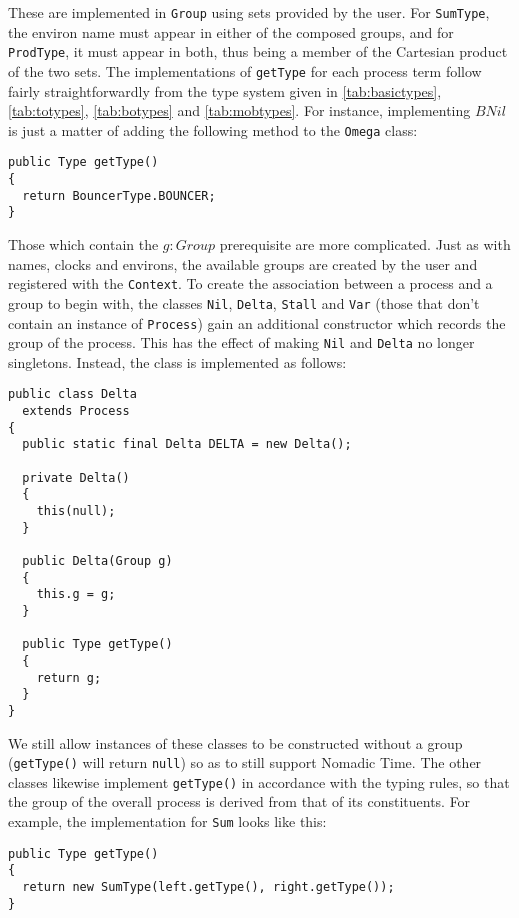 These are implemented in \texttt{Group} using sets provided by the
user.  For \texttt{SumType}, the environ name must appear in either of
the composed groups, and for \texttt{ProdType}, it must appear in
both, thus being a member of the Cartesian product of the two sets.
The implementations of \texttt{getType} for each process term follow
fairly straightforwardly from the type system given in
\ref{tab:basictypes}, \ref{tab:totypes}, \ref{tab:botypes} and
\ref{tab:mobtypes}.  For instance, implementing $BNil$ is just a
matter of adding the following method to the \texttt{Omega} class:

\begin{verbatim}
public Type getType()
{
  return BouncerType.BOUNCER;
}
\end{verbatim}

Those which contain the $g : Group$ prerequisite are more complicated.
Just as with names, clocks and environs, the available groups are
created by the user and registered with the \texttt{Context}.  To
create the association between a process and a group to begin with,
the classes \texttt{Nil}, \texttt{Delta}, \texttt{Stall} and
\texttt{Var} (those that don't contain an instance of
\texttt{Process}) gain an additional constructor which records the
group of the process.  This has the effect of making \texttt{Nil} and
\texttt{Delta} no longer singletons.  Instead, the class is
implemented as follows:

\begin{verbatim}
public class Delta
  extends Process
{
  public static final Delta DELTA = new Delta();

  private Delta() 
  { 
    this(null); 
  }
  
  public Delta(Group g) 
  { 
    this.g = g; 
  }

  public Type getType()
  {
    return g;
  }
}
\end{verbatim}

We still allow instances of these classes to be constructed without a
group (\texttt{getType()} will return \texttt{null}) so as to still
support Nomadic Time.  The other classes likewise implement
\texttt{getType()} in accordance with the typing rules, so that the
group of the overall process is derived from that of its constituents.
For example, the implementation for \texttt{Sum} looks like this:

\begin{verbatim}
public Type getType()
{
  return new SumType(left.getType(), right.getType());
}
\end{verbatim}

